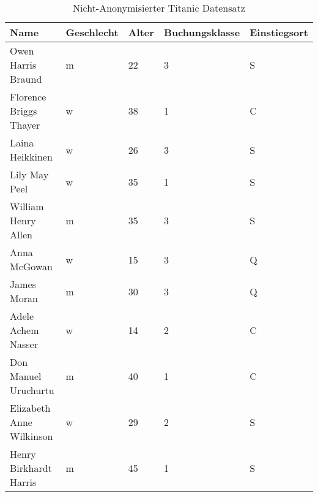 \begin{table}[!htb]
\centering
\begin{tabular}{|l|l|l|l|l|}
\hline
\rowcolor[HTML]{EFEFEF} 
Name                     & Geschlecht & Alter & Buchungsklasse & Einstiegsort \\ \hline
Owen Harris Braund       & m          & 22    & 3              & S            \\ \hline
Florence Briggs Thayer   & w          & 38    & 1              & C            \\ \hline
Laina Heikkinen          & w          & 26    & 3              & S            \\ \hline
Lily May Peel            & w          & 35    & 1              & S            \\ \hline
William Henry Allen      & m          & 35    & 3              & S            \\ \hline
Anna McGowan             & w          & 15    & 3              & Q            \\ \hline
James Moran              & m          & 30    & 3              & Q            \\ \hline
Adele Achem Nasser       & w          & 14    & 2              & C            \\ \hline
Don Manuel Uruchurtu     & m          & 40    & 1              & C            \\ \hline
Elizabeth Anne Wilkinson & w          & 29    & 2              & S            \\ \hline
Henry Birkhardt Harris   & m          & 45    & 1              & S            \\ \hline
\end{tabular}
\caption{Nicht-Anonymisierter Titanic Datensatz \cite{D-titanic}}
\label{tab:nicht_ano_titanic}
\end{table}